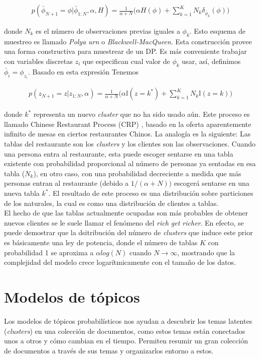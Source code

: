 \documentclass[letterpaper,12pt,oneside]{book} %
\begin{document}
\begin{align}
p(\bar{\phi}_{N+1}=\phi|\bar{\phi}_{1:N}, \alpha, H) = \frac{1}{\alpha+N}\bigg(\alpha H(\phi)+\sum_{k=1}^{K}N_{k}\delta_{\bar{\phi}_{k}}(\phi)\bigg)
\end{align}

donde $N_{k}$ es el número de observaciones previas iguales a $\phi_{k}$. Esto esquema de muestreo es llamado \textit{Polya urn} o \textit{Blackwell-MacQueen}. Esta construcción provee una forma constructiva para muestrear de un DP. Es más conveniente trabajar con variables discretas $z_{i}$ que especifican cual valor de $\phi_{k}$ usar, así, definimos $\bar{\phi}_{i}=\phi_{z_{i}}$. Basado en esta expresión Tenemos

\begin{align}
p(z_{N+1}=z|z_{1:N}, \alpha) = \frac{1}{\alpha+N}\bigg(\alpha\mathbb{I}(z=k^{*})+\sum_{k=1}^{K}N_{k}\mathbb{I}(z=k)\bigg)
\end{align}

donde $k^{*}$ representa un nuevo \textit{cluster} que no ha sido usado aún. Este proceso es llamado Chinese Restaurant Process (CRP) \citep{aldous1985exchangeability}, basado en la oferta aparentemente infinito de mesas en ciertos restaurantes Chinos. La analogía es la siguiente: Las tablas del restaurante son los \textit{clusters}  y los clientes son las observaciones. Cuando una persona entra al restaurante, esta puede escoger sentarse en una tabla existente con probabilidad proporcional al número de personas ya sentadas en esa tabla ($N_{k}$), en otro caso, con una probabilidad decreciente a medida que más personas entran al restaurante (debido a $1/(\alpha +N))$ escogerá sentarse en una nueva tabla $k^{*}$. El resultado de este proceso es una distribución sobre particiones de los naturales, la cual es como una distribución de clientes a tablas.\\

El hecho de que las tablas actualmente ocupadas son más probables de obtener nuevos clientes se le suele llamar el fenómeno del \textit{rich get richer}. En efecto, se puede demostrar que la dsitribución del número de \textit{clusters} que induce este prior es básicamente una ley de potencia, donde el número de tablas $K$ con probabilidad 1 se aproxima a $\alpha log(N)$ cuando $N\rightarrow \infty$, mostrando que la complejidad del modelo crece logarítmicamente con el tamaño de los datos.

\section{Modelos de tópicos}
\label{sec:topic_models}
Los modelos de tópicos probabilísticos nos ayudan a descubrir los temas latentes (\textit{clusters}) en una colección de documentos, como estos temas están conectados unos a otros y cómo cambian en el tiempo. Permiten resumir un gran colección de documentos a través de sus temas y organizarlos entorno a estos.\\
\end{document}
